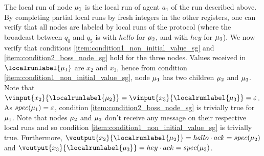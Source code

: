 \begin{example}
	The local run of node $\mu_1$ is the local run of agent $a_1$ of the run described above. 
	By completing partial local runs by fresh integers in the other registers, one can verify that all nodes are labeled by local runs of the protocol (where the broadcast between $q_0$ and $q_5$ is with $hello$ for $\mu_2$, and with $hey$ for $\mu_3$).
	We now verify that conditions  \ref{item:condition1_non_initial_value_sg} and \ref{item:condition2_boss_node_sg} hold for the three nodes. Values received in $\localrunlabel{\node_1}$ are $x_2$ and $x_3$, hence from condition \ref{item:condition1_non_initial_value_sg}, node $\mu_1$ has two children $\mu_2$ and $\mu_3$. Note that $\vinput{x_2}{\localrunlabel{\node_2}} = \vinput{x_3}{\localrunlabel{\node_3}} = \epsilon$. As $\spec(\node_1) = \epsilon$, condition \ref{item:condition2_boss_node_sg} is trivially true for $\mu_1$. Note that nodes $\mu_2$ and $\mu_3$ don't receive any message on their respective local runs and so condition \ref{item:condition1_non_initial_value_sg} is trivially true. Furthermore, $\voutput{x_2}{\localrunlabel{\node_2}} = hello \cdot ack = \spec(\node_2)$ and $\voutput{x_3}{\localrunlabel{\node_3}} = hey \cdot ack = \spec(\node_3)$.
\end{example}


